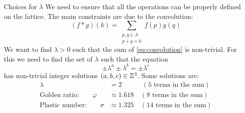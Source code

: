 \documentclass{beamer} %
\begin{document}
\begin{frame}{Choices for $\lambda$}
  We need to ensure that all the operations can be properly defined on the lattice. The main constraints are due to the convolution:
  \begin{equation}\label{eq:convolution}
    (f*g)(k) = \sum_{\substack{p,q\in \Lambda\\p+q=k}} f(p)g(q)
  \end{equation}
  We want to find $\lambda>0$ such that the sum of \eqref{eq:convolution} is non-trivial. For this we need to find the set of $\lambda$ such that the equation
  \begin{equation}
    \pm\lambda^a  \pm\lambda^b = \pm\lambda^c
  \end{equation}
  has non-trivial integer solutions $(a,b,c)\in\mathbb{Z}^3$.
  Some solutions are:
  \begin{align*}
    \lambda                            & = 2                    \qquad\quad\! (\text{5 terms in the sum}) \\
    \text{Golden ratio:}\qquad \varphi & \approx 1.618\quad (\text{8 terms in the sum})                   \\
    \text{Plastic number:}\qquad\sigma & \approx 1.325\quad (\text{14 terms in the sum})
  \end{align*}
\end{frame}
\end{document}
